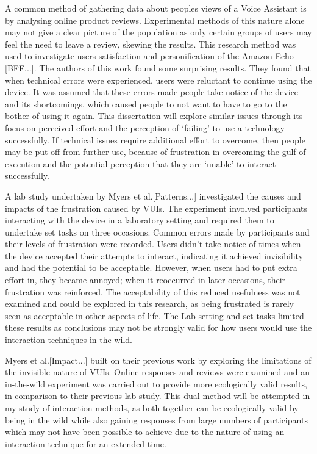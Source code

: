 \documentclass{l4proj}
\begin{document}
A common method of gathering data about peoples views of a Voice Assistant is by analysing online product reviews. Experimental methods of this nature alone may not give a clear picture of the population as only certain groups of users may feel the need to leave a review, skewing the results. This research method was used to investigate users satisfaction and personification of the Amazon Echo [BFF...]. The authors of this work found some surprising results. They found that when technical errors were experienced, users were reluctant to continue using the device. It was assumed that these errors made people take notice of the device and its shortcomings, which caused people to not want to have to go to the bother of using it again. This dissertation will explore similar issues through its focus on perceived effort and the perception of `failing' to use a technology successfully. If technical issues require additional effort to overcome, then people may be put off from further use, because of frustration in overcoming the gulf of execution and the potential perception that they are `unable' to interact successfully.

A lab study undertaken by Myers et al.[Patterns...] investigated the causes and impacts of the frustration caused by VUIs. The experiment involved participants interacting with the device in a laboratory setting and required them to undertake set tasks on three occasions. Common errors made by participants and their levels of frustration were recorded. Users didn't take notice of times when the device accepted their attempts to interact, indicating it achieved invisibility and had the potential to be acceptable. However, when users had to put extra effort in, they became annoyed; when it reoccurred in later occasions, their frustration was reinforced. The acceptability of this reduced usefulness was not examined and could be explored in this research, as being frustrated is rarely seen as acceptable in other aspects of life. The Lab setting and set tasks limited these results as conclusions may not be strongly valid for how users would use the interaction techniques in the wild.

Myers et al.[Impact...] built on their previous work by exploring the limitations of the invisible nature of VUIs. Online responses and reviews were examined and an in-the-wild experiment was carried out to provide more ecologically valid results, in comparison to their previous lab study. This dual method will be attempted in my study of interaction methods, as both together can be ecologically valid by being in the wild while also gaining responses from large numbers of participants which may not have been possible to achieve due to the nature of using an interaction technique for an extended time.
\end{document}
